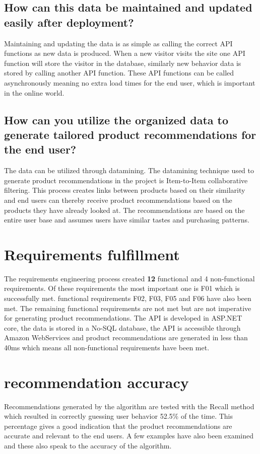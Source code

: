 \subsection{How can this data be maintained and updated easily after deployment?}
Maintaining and updating the data is as simple as calling the correct API functions as new data is produced. When a new visitor visits the site one API function will store the visitor in the database, similarly new behavior data is stored by calling another API function. These API functions can be called asynchronously meaning no extra load times for the end user, which is important in the online world.

\subsection{How can you utilize the organized data to generate tailored product recommendations for the end user?}
The data can be utilized through datamining. The datamining technique used to generate product recommendations in the project is Item-to-Item collaborative filtering. This process creates links between products based on their similarity and end users can thereby receive product recommendations based on the products they have already looked at. The recommendations are based on the entire user base and assumes users have similar tastes and purchasing patterns.

\section{Requirements fulfillment}
The requirements engineering process created \textbf{12} functional and 4 non-functional requirements. Of these requirements the most important one is F01 which is successfully met. functional requirements F02, F03, F05 and F06 have also been met. The remaining functional requirements are not met but are not imperative for generating product recommendations. The API is developed in ASP.NET core, the data is stored in a No-SQL database, the API is accessible through Amazon WebServices and product recommendations are generated in less than 40ms which means all non-functional requirements have been met.

\section{recommendation accuracy}
Recommendations generated by the algorithm are tested with the Recall method which resulted in correctly guessing user behavior 52.5\% of the time. This percentage gives a good indication that the product recommendations are accurate and relevant to the end users. A few examples have also been examined and these also speak to the accuracy of the algorithm. 